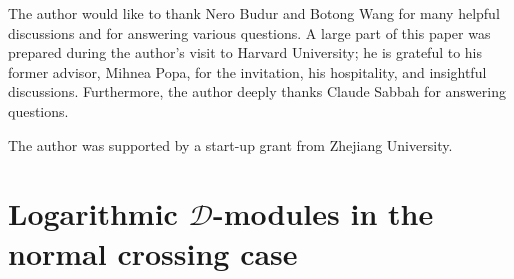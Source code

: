 \documentclass{amsart}
\theoremstyle{plain}
\numberwithin{theorem}{section}
\theoremstyle{definition}
\theoremstyle{remark}
\theoremstyle{definition}
\newcommand{\Q}{\mathbb{Q}}
\newcommand{\shD}{\mathscr{D}}
\begin{document}




The author would like to thank Nero Budur and Botong Wang for many helpful discussions and for answering various questions. A large part of this paper was prepared during the author’s visit to Harvard University; he is grateful to his former advisor, Mihnea Popa, for the invitation, his hospitality, and insightful discussions. Furthermore, the author deeply thanks Claude Sabbah for answering questions.

The author was supported by a start-up grant from Zhejiang University.

\section{Logarithmic $\shD$-modules in the normal crossing case}\label{sect:logdmodule}
\end{document}
